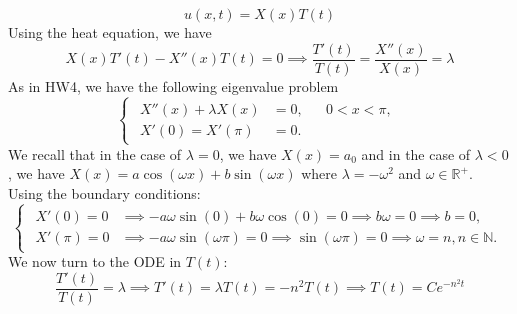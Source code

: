 \documentclass[plain]{pset}
\begin{document}
\begin{solution}
    \[u(x, t) = X(x)T(t)\]
    Using the heat equation, we have
    \[
        X(x)T'(t) - X''(x)T(t) = 0 \implies \frac{T'(t)}{T(t)} = \frac{X''(x)}{X(x)} = \lambda
    \]
    As in HW4, we have the following eigenvalue problem
    \[
        \begin{cases}
            \begin{aligned}
                X''(x) + \lambda X(x) & = 0, &  & 0 < x < \pi, \\
                X'(0) = X'(\pi)       & = 0.
            \end{aligned}
        \end{cases}
    \]
    We recall that in the case of \(\lambda = 0\), we have \(X(x) = a_0\) and in the case of \(\lambda < 0\), we have \(X(x) = a\cos(\omega x) + b\sin(\omega x)\) where \(\lambda = -\omega^2\) and \(\omega \in \mathbb{R}^+\). Using the boundary conditions:
    \[
        \begin{cases}
            \begin{aligned}
                X'(0) = 0 & \implies -a\omega\sin(0) + b\omega\cos(0) = 0 \implies b\omega = 0 \implies b = 0, \\
                X'(\pi) = 0 & \implies -a\omega\sin(\omega\pi) = 0 \implies \sin(\omega\pi) = 0 \implies \omega = n, n \in \mathbb{N}.
            \end{aligned}
        \end{cases}
    \]
    We now turn to the ODE in \(T(t)\):
    \[
        \frac{T'(t)}{T(t)} = \lambda \implies T'(t) = \lambda T(t) = -n^2T(t) \implies T(t) = Ce^{-n^2t}
    \]
\end{solution}
\end{document}

